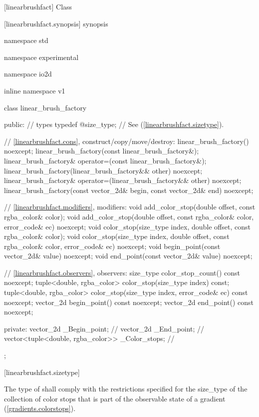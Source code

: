  [linearbrushfact] {Class }

 [linearbrushfact.synopsis] { synopsis}

\begin{codeblock}
namespace std { namespace experimental { namespace io2d { inline namespace v1 {
  class linear_brush_factory {
  public:
    // types
    typedef @\impdef@          size_type; // See (\ref{linearbrushfact.sizetype}).
    
    // \ref{linearbrushfact.cons}, construct/copy/move/destroy:
    linear_brush_factory() noexcept;
    linear_brush_factory(const linear_brush_factory&);
    linear_brush_factory& operator=(const linear_brush_factory&);
    linear_brush_factory(linear_brush_factory&& other) noexcept;
    linear_brush_factory& operator=(linear_brush_factory&& other) noexcept;
    linear_brush_factory(const vector_2d& begin, const vector_2d& end) noexcept;

    // \ref{linearbrushfact.modifiers}, modifiers:
    void add_color_stop(double offset, const rgba_color& color);
    void add_color_stop(double offset, const rgba_color& color, 
      error_code& ec) noexcept;
    void color_stop(size_type index, double offset,
      const rgba_color& color);
    void color_stop(size_type index, double offset,
      const rgba_color& color, error_code& ec) noexcept;
    void begin_point(const vector_2d& value) noexcept;
    void end_point(const vector_2d& value) noexcept;

    // \ref{linearbrushfact.observers}, observers:
    size_type color_stop_count() const noexcept;
    tuple<double, rgba_color> color_stop(size_type index) const;
    tuple<double, rgba_color> color_stop(size_type index,
      error_code& ec) const noexcept;
    vector_2d begin_point() const noexcept;
    vector_2d end_point() const noexcept;

  private:
    vector_2d _Begin_point;                             // \expos
    vector_2d _End_point;                               // \expos
    vector<tuple<double, rgba_color>> _Color_stops; // \expos
  };
} } } }
\end{codeblock}

 [linearbrushfact.sizetype] {}

\pnum
The type of  shall comply with the restrictions specified for the size_type of the collection of color stops that is part of the observable state of a gradient (\ref{gradients.colorstops}).


